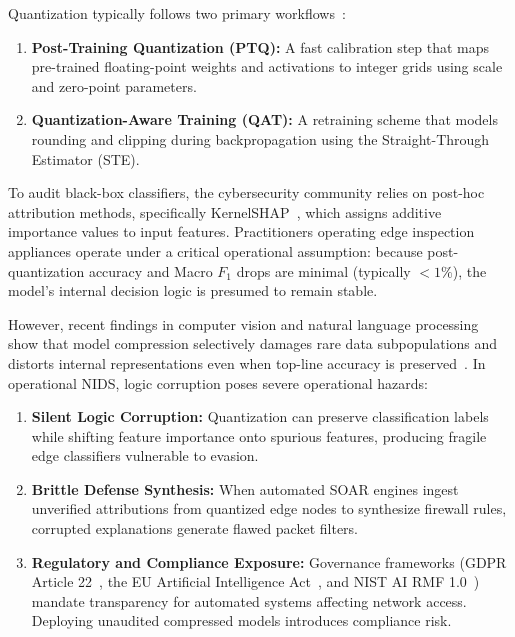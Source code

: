 \documentclass[conference]{IEEEtran}
\begin{document}
Quantization typically follows two primary workflows~\cite{b5}:
\begin{enumerate}
    \item \textbf{Post-Training Quantization (PTQ):} A fast calibration step that maps pre-trained floating-point weights and activations to integer grids using scale and zero-point parameters.
    \item \textbf{Quantization-Aware Training (QAT):} A retraining scheme that models rounding and clipping during backpropagation using the Straight-Through Estimator (STE).
\end{enumerate}

To audit black-box classifiers, the cybersecurity community relies on post-hoc attribution methods, specifically KernelSHAP~\cite{b4}, which assigns additive importance values to input features. Practitioners operating edge inspection appliances operate under a critical operational assumption: because post-quantization accuracy and Macro $F_1$ drops are minimal (typically $< 1\%$), the model's internal decision logic is presumed to remain stable.

However, recent findings in computer vision and natural language processing show that model compression selectively damages rare data subpopulations and distorts internal representations even when top-line accuracy is preserved~\cite{b6}. In operational NIDS, logic corruption poses severe operational hazards:
\begin{enumerate}
    \item \textbf{Silent Logic Corruption:} Quantization can preserve classification labels while shifting feature importance onto spurious features, producing fragile edge classifiers vulnerable to evasion.
    \item \textbf{Brittle Defense Synthesis:} When automated SOAR engines ingest unverified attributions from quantized edge nodes to synthesize firewall rules, corrupted explanations generate flawed packet filters.
    \item \textbf{Regulatory and Compliance Exposure:} Governance frameworks (GDPR Article 22~\cite{b7}, the EU Artificial Intelligence Act~\cite{b8}, and NIST AI RMF 1.0~\cite{b9}) mandate transparency for automated systems affecting network access. Deploying unaudited compressed models introduces compliance risk.
\end{enumerate}
\end{document}
